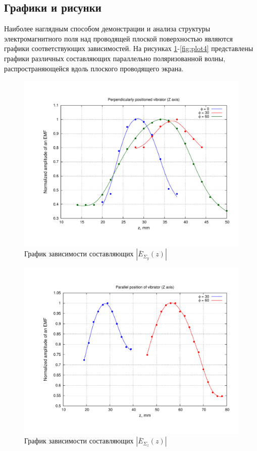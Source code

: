 \documentclass[11pt,a4paper,oneside, titlepage,reqno]{amsproc}
\begin{document}
\subsection{Графики и рисунки}
Наиболее наглядным способом демонстрации и анализа структуры электромагнитного поля над
проводящей плоской поверхностью являются графики соответствующих зависимостей.
На рисунках \ref{fig:plot1}-\ref{fig:plot4} представлены графики различных составляющих
параллельно поляризованной волны, распространяющейся вдоль плоского проводящего экрана.

\begin{figure}[hb!]
    \begin{center}
        \includegraphics[width=\textwidth]{plot1.pdf}
    \end{center}
    \vspace {-20 pt}
    \caption{График зависимости составляющих $|\overline{E}_{\Sigma_y}(z)|$}
    \label{fig:plot1}
\end{figure}

\begin{figure}[hb!]
    \begin{center}
        \includegraphics[width=\textwidth]{plot2.pdf}
    \end{center}
    \caption{График зависимости составляющих $|\overline{E}_{\Sigma_z}(z)|$}
    \label{fig:plot2}
\end{figure}
\end{document}
